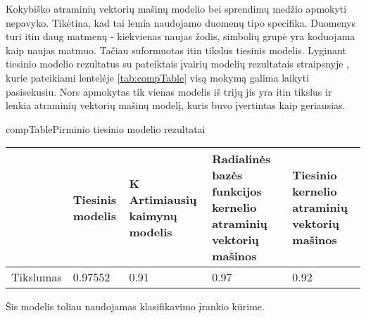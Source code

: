 
Kokybiško atraminių vektorių mašinų modelio bei sprendimų medžio apmokyti nepavyko. Tikėtina, kad tai lemia naudojamo duomenų tipo specifika. Duomenys turi itin daug matmenų - kiekvienas naujas žodis, simbolių grupė yra koduojama kaip naujas matmuo. Tačiau suformuotas itin tikslus tiesinis modelis. Lyginant tiesinio modelio rezultatus su pateiktais įvairių modelių rezultatais straipsnyje \cite{comp}, kurie pateikiami lentelėje \vref{tab:compTable} visą mokymą galima laikyti pasisekusiu. Nors apmokytas tik vienas modelis iš trijų jis yra itin tikslus ir lenkia atraminių vektorių mašinų modelį, kuris buvo įvertintas kaip geriausias.

\begin{ktutable}{compTable}{Pirminio tiesinio modelio rezultatai}
    \begin{tabular}{|l|p{3cm}|p{3cm}|p{3cm}|p{3cm}|}
    \hline
                             & Tiesinis modelis  &  K Artimiausių kaimynų modelis  &  Radialinės bazės funkcijos kernelio atraminių vektorių mašinos  &  Tiesinio kernelio atraminių vektorių mašinos               \\ \hline
               Tikslumas     & 0.97552           & 0.91   & 0.97  &  0.92         \\ \hline
    \end{tabular}
\end{ktutable}

Šis modelis toliau naudojamas klasifikavimo įrankio kūrime.